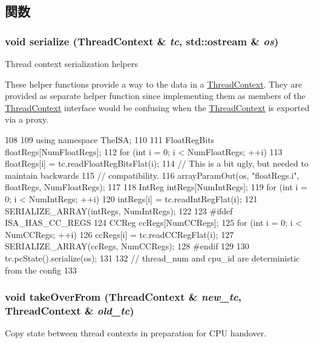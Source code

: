 \subsection{関数}
\hypertarget{thread__context_8hh_a40792bd7060f1fdd6c31469ce46d0a95}{
\subsubsection[{serialize}]{\setlength{\rightskip}{0pt plus 5cm}void serialize ({\bf ThreadContext} \& {\em tc}, \/  std::ostream \& {\em os})}}
\label{thread__context_8hh_a40792bd7060f1fdd6c31469ce46d0a95}
Thread context serialization helpers

These helper functions provide a way to the data in a \hyperlink{classThreadContext}{ThreadContext}. They are provided as separate helper function since implementing them as members of the \hyperlink{classThreadContext}{ThreadContext} interface would be confusing when the \hyperlink{classThreadContext}{ThreadContext} is exported via a proxy. 


\begin{DoxyCode}
108 {
109     using namespace TheISA;
110 
111     FloatRegBits floatRegs[NumFloatRegs];
112     for (int i = 0; i < NumFloatRegs; ++i)
113         floatRegs[i] = tc.readFloatRegBitsFlat(i);
114     // This is a bit ugly, but needed to maintain backwards
115     // compatibility.
116     arrayParamOut(os, "floatRegs.i", floatRegs, NumFloatRegs);
117 
118     IntReg intRegs[NumIntRegs];
119     for (int i = 0; i < NumIntRegs; ++i)
120         intRegs[i] = tc.readIntRegFlat(i);
121     SERIALIZE_ARRAY(intRegs, NumIntRegs);
122 
123 #ifdef ISA_HAS_CC_REGS
124     CCReg ccRegs[NumCCRegs];
125     for (int i = 0; i < NumCCRegs; ++i)
126         ccRegs[i] = tc.readCCRegFlat(i);
127     SERIALIZE_ARRAY(ccRegs, NumCCRegs);
128 #endif
129 
130     tc.pcState().serialize(os);
131 
132     // thread_num and cpu_id are deterministic from the config
133 }
\end{DoxyCode}
\hypertarget{thread__context_8hh_a5f8808341daf3a8e3d0deb3852b1855f}{
\subsubsection[{takeOverFrom}]{\setlength{\rightskip}{0pt plus 5cm}void takeOverFrom ({\bf ThreadContext} \& {\em new\_\-tc}, \/  {\bf ThreadContext} \& {\em old\_\-tc})}}
\label{thread__context_8hh_a5f8808341daf3a8e3d0deb3852b1855f}
Copy state between thread contexts in preparation for CPU handover.

